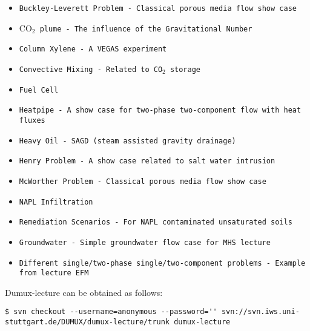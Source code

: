 \begin{itemize}
\item \texttt{Buckley-Leverett Problem - Classical porous media flow show case}
\item \texttt{$\text{CO}_2$ plume - The influence of the Gravitational Number}
\item \texttt{Column Xylene - A VEGAS experiment}
\item \texttt{Convective Mixing - Related to CO$_2$ storage}
\item \texttt{Fuel Cell}
\item \texttt{Heatpipe - A show case for two-phase two-component flow with heat fluxes}
\item \texttt{Heavy Oil - SAGD (steam assisted gravity drainage)}
\item \texttt{Henry Problem - A show case related to salt water intrusion}
\item \texttt{McWorther Problem - Classical porous media flow show case}
\item \texttt{NAPL Infiltration}
\item \texttt{Remediation Scenarios - For NAPL contaminated unsaturated soils}
\item \texttt{Groundwater - Simple groundwater flow case for MHS lecture}
\item \texttt{Different single/two-phase single/two-component problems - Example from lecture EFM}
\end{itemize}

Dumux-lecture can be obtained as follows:
\begin{lstlisting}[style=Bash]
$ svn checkout --username=anonymous --password='' svn://svn.iws.uni-stuttgart.de/DUMUX/dumux-lecture/trunk dumux-lecture
\end{lstlisting}
